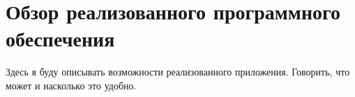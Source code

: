 
\newpage

\chapter{Обзор реализованного программного обеспечения}

Здесь я буду описывать возможности реализованного приложения. Говорить, что может и насколько это удобно.